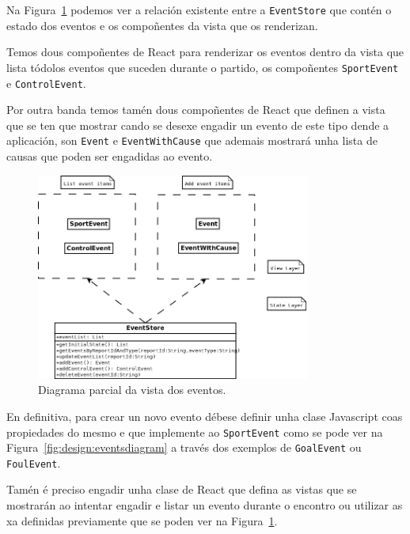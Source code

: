   Na Figura~\ref{fig:design:eventviewdiagram} podemos ver a relación existente 
entre a \lstinline{EventStore} que contén o estado dos eventos e os compoñentes 
da vista que os renderizan.

  Temos dous compoñentes de React para renderizar os eventos dentro da vista 
que lista tódolos eventos que suceden durante o partido, os compoñentes 
\lstinline{SportEvent} e \lstinline{ControlEvent}.

  Por outra banda temos tamén dous compoñentes de React que definen a vista que 
se ten que mostrar cando se desexe engadir un evento de este tipo dende a 
aplicación, son \lstinline{Event} e \lstinline{EventWithCause} que ademais 
mostrará unha lista de causas que poden ser engadidas ao evento.

    \begin{figure}[h!]
      \begin{center}
  \includegraphics[width=0.8\textwidth]{./img/diagrams/events_view_diagram.png}
      \caption{Diagrama parcial da vista dos eventos.}
      \label{fig:design:eventviewdiagram}
      \end{center}
    \end{figure}


  En definitiva, para crear un novo evento débese definir unha clase Javascript 
coas propiedades do mesmo e que implemente ao \lstinline{SportEvent} como se 
pode ver na Figura~\ref{fig:design:eventsdiagram} a través dos exemplos de 
\lstinline{GoalEvent} ou \lstinline{FoulEvent}.

  Tamén é preciso engadir unha clase de React que defina as vistas que se 
mostrarán ao intentar engadir e listar un evento durante o encontro ou 
utilizar as xa definidas previamente que se poden ver na 
Figura~\ref{fig:design:eventviewdiagram}.

